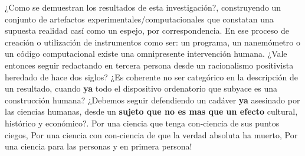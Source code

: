 ¿Como se demuestran los resultados de esta investigación?, construyendo un conjunto de artefactos experimentales/computacionales que constatan una supuesta realidad casí como un espejo, por correspondencia. En ese proceso de creación o utilización de instrumentos como ser: un programa, un nanemómetro o un código computacional existe una omnipresente intervención humana. ¿Vale entonces seguir redactando en tercera persona desde un racionalismo positivista heredado de hace dos siglos? ¿Es coherente no ser categórico en la descripción de un resultado, cuando \textbf{ya} todo el dispositivo ordenatorio que subyace es una construcción humana? ¿Debemos seguir defendiendo un cadáver \textbf{ya} asesinado por las ciencias humanas, desde un \textbf{sujeto que no es mas que un efecto} cultural, histórico y económico?. Por una ciencia que tenga con-ciencia de sus puntos ciegos, Por una ciencia con con-ciencia de que la verdad absoluta ha muerto, Por una ciencia para las personas y en primera persona! 


